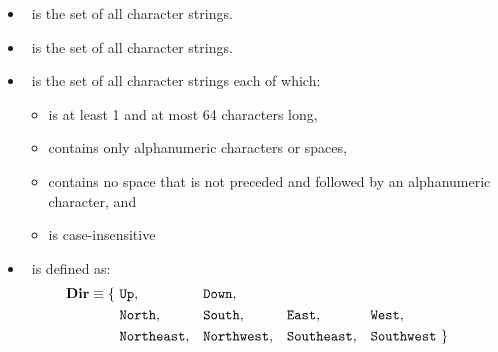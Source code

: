\begin{itemize}
\item \descset\ is the set of all character strings.
\item \speechset\ is the set of all character strings.
\item \nameset\ is the set of all character strings each of which:
  \begin{itemize}
  \item is at least 1 and at most 64 characters long,
  \item contains only alphanumeric characters or spaces,
  \item contains no space that is not preceded and followed by an
    alphanumeric character, and
  \item is case-insensitive
  \end{itemize}
\item \dirset\ is defined as:
  \begin{align*}
    \textbf{Dir} \equiv \{~&
  \texttt{Up},
  && \texttt{Down}, \\
  & \texttt{North},
  && \texttt{South},
  && \texttt{East},
  && \texttt{West}, \\
  & \texttt{Northeast},
  && \texttt{Northwest},
  && \texttt{Southeast},
  && \texttt{Southwest}
  ~\}
  \end{align*}
\end{itemize}
